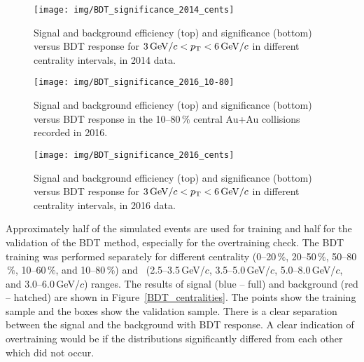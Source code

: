 \begin{figure}[!p]

\centering
\texttt{[image: img/BDT\_significance\_2014\_cents]}
\vspace{-1cm}
\caption[Signal and background efficiency and significance versus BDT response for $3\,\text{GeV}/c < \pt < 6\,\text{GeV}/c$ in different centrality intervals, in 2014 data.]{\label{BDT_sig_2014_cent}Signal and background efficiency (top) and significance (bottom) versus BDT response for $3\,\text{GeV}/c < \pt < 6\,\text{GeV}/c$ in different centrality intervals, in 2014 data.}
\end{figure}

\begin{figure}[!p]
\vspace{-0.7cm}
\centering
\texttt{[image: img/BDT\_significance\_2016\_10-80]}
\vspace{-1cm}
\caption[Signal and background efficiency and significance versus BDT response in the 10--80$\,\%$ central Au+Au collisions recorded in 2016.]{\label{BDT_sig_2016_pt}Signal and background efficiency (top) and significance (bottom) versus BDT response in the 10--80$\,\%$ central Au+Au collisions recorded in 2016.}
\end{figure}

\begin{figure}[!p]

\centering
\texttt{[image: img/BDT\_significance\_2016\_cents]}
\vspace{-1cm}
\caption[Signal and background efficiency and significance versus BDT response for $3\,\text{GeV}/c < \pt < 6\,\text{GeV}/c$ in different centrality intervals, in 2016 data.]{\label{BDT_sig_2016_cent}Signal and background efficiency (top) and significance (bottom) versus BDT response for $3\,\text{GeV}/c < \pt < 6\,\text{GeV}/c$ in different centrality intervals, in 2016 data.}
\end{figure}

Approximately half of the simulated events are used for training and half for the validation of the BDT method, especially for the overtraining check. The BDT training was performed separately for different centrality (0--20$\,\%$, 20--50$\,\%$, 50--80$\,\%$, 10--60$\,\%$, and 10--80$\,\%$) and \pt\ (2.5--3.5$\,$GeV/$c$, 3.5--5.0$\,$GeV/$c$, 5.0--8.0$\,$GeV/$c$,
and 3.0--6.0$\,$GeV/$c$) ranges. The results of signal (blue -- full) and background (red -- hatched) are shown in Figure~\ref{BDT_centralities}\@. The points show the training sample and the boxes show the validation sample. There is a clear separation between the signal and the background with BDT response. A clear indication of overtraining would be if the distributions significantly differed from each other which did not occur.

